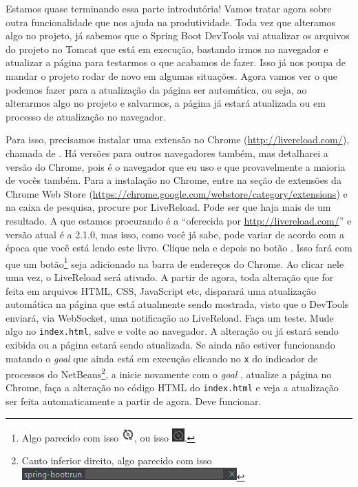 Estamos quase terminando essa parte introdutória! Vamos tratar agora sobre outra funcionalidade que nos ajuda na produtividade. Toda vez que alteramos algo no projeto, já sabemos que o Spring Boot DevTools vai atualizar os arquivos do projeto no Tomcat que está em execução, bastando irmos no navegador e atualizar a página para testarmos o que acabamos de fazer. Isso já nos poupa de mandar o projeto rodar de novo em algumas situações. Agora vamos ver o que podemos fazer para a atualização da página ser automática, ou seja, ao alterarmos algo no projeto e salvarmos, a página já estará atualizada ou em processo de atualização no navegador.

Para isso, precisamos instalar uma extensão no Chrome (\url{http://livereload.com/}), chamada de . Há versões para outros navegadores também, mas detalharei a versão do Chrome, pois é o navegador que eu uso e que provavelmente a maioria de vocês também. Para a instalação no Chrome, entre na seção de extensões da Chrome Web Store (\url{https://chrome.google.com/webstore/category/extensions}) e na caixa de pesquisa, procure por LiveReload. Pode ser que haja mais de um resultado. A que estamos procurando é a ``oferecida por \url{http://livereload.com/}'' e versão atual é a 2.1.0, mas isso, como você já sabe, pode variar de acordo com a época que você está lendo este livro. Clique nela e depois no botão . Isso fará com que um botão\footnote{Algo parecido com isso \includegraphics[scale=1]{imagens/cap10BotaoLiveReloadBranco}, ou isso \includegraphics[scale=1]{imagens/cap10BotaoLiveReloadPreto}.} seja adicionado na barra de endereços do Chrome. Ao clicar nele uma vez, o LiveReload será ativado. A partir de agora, toda alteração que for feita em arquivos HTML, CSS, JavaScript etc, disparará uma atualização automática na página que está atualmente sendo mostrada, visto que o DevTools enviará, via WebSocket, uma notificação ao LiveReload. Faça um teste. Mude algo no \texttt{index.html}, salve e volte ao navegador. A alteração ou já estará sendo exibida ou a página estará sendo atualizada. Se ainda não estiver funcionando matando o \textit{goal}  que ainda está em execução clicando no \texttt{x} do indicador de processos do NetBeans\footnote{Canto inferior direito, algo parecido com isso \includegraphics[scale=1]{imagens/cap10MatarProcessoSpringBootRun}}, a inicie novamente com o \textit{goal} , atualize a página no Chrome, faça a alteração no código HTML do \texttt{index.html} e veja a atualização ser feita automaticamente a partir de agora. Deve funcionar.

